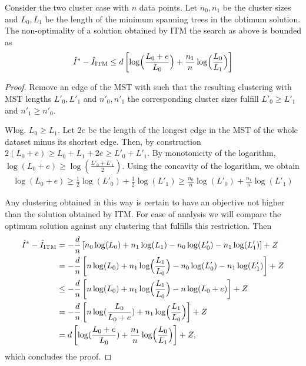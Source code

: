 \documentclass[runningheads]{llncs}
\begin{document}
\begin{theorem}
Consider the two cluster case with $n$ data points.
Let $n_0, n_1$ be the cluster sizes and $L_0, L_1$ be the length of the minimum spanning trees in the obtimum solution.
The non-optimality of a solution obtained by ITM the search as above is bounded as
\begin{align}
    \hat{I}^* - \hat{I}_{\text{ITM}} \leq 
         d \left [ \log \Bigl(\frac{L_0 + e}{L_0}\Bigr) + \frac{n_1}{n} \log \Bigl(\frac{L_0}{L_1} \Bigr) \right] 
\end{align}
\begin{proof}
Remove an edge of the MST with such that the resulting clustering with
MST lengths $L'_0, L'_1$ and $n'_0, n'_1$ the corresponding cluster sizes fulfill $L'_0 \geq L'_1$ and $n'_1 \geq n'_0$.

Wlog. $L_0 \geq L_1$.
Let $2e$ be the length of the longest edge in the MST of the whole dataset minus its shortest edge.
Then, by construction $2 (L_0 + e) \geq L_0 + L_1 + 2e \geq L'_0 + L'_1$.
By monotonicity of the logarithm, $\log(L_0 + e) \geq \log(\frac{L'_0 + L'_1}{2})$.
Using the concavity of the logarithm, we obtain
\begin{align}\label{concavity}
    \log(L_0 + e) \geq \frac{1}{2} \log(L'_0) + \frac{1}{2} \log(L'_1) \geq \frac{n_0}{n}\log(L'_0) + \frac{n_1}{n}\log(L'_1)
\end{align}

Any clustering obtained in this way is certain to have an objective not higher than the solution obtained by ITM\@.
For ease of analysis we will compare the optimum solution against any clustering that fulfills this restriction.
Then 
\begin{align}
    \hat{I}^* - \hat{I}_{\text{ITM}}
    & = -\frac{d}{n} \left [n_0 \log(L_0) + n_1 \log(L_1) - n_0 \log(L'_0) - n_1 \log(L'_1) \right ] + Z\\
    & = -\frac{d}{n} \left [n \log(L_0) + n_1 \log\Bigl (\frac{L_1}{L_0} \Bigr) - n_0 \log(L'_0) - n_1 \log(L'_1) \right] +Z\\
    & \leq -\frac{d}{n} \left [n \log(L_0) + n_1 \log\Bigl (\frac{L_1}{L_0} \Bigr) - n\log(L_0 + e) \right] +Z\\
    & = -\frac{d}{n} \left [n \log(\frac{L_0}{L_0 + e}) + n_1 \log\Bigl (\frac{L_1}{L_0} \Bigr) \right] +Z\\
    & = d \left [ \log(\frac{L_0 + e}{L_0}) + \frac{n_1}{n} \log \Bigl(\frac{L_0}{L_1} \Bigr) \right] + Z, 
\end{align}
which concludes the proof.
\end{proof}


\end{theorem}
\end{document}
